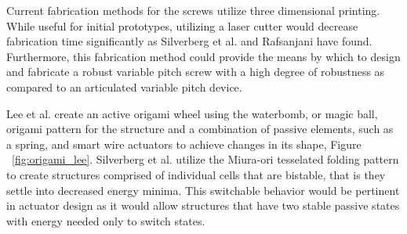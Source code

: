 Current fabrication methods for the screws utilize three dimensional printing. While useful for initial prototypes, utilizing a laser cutter would decrease fabrication time significantly as Silverberg et al. \cite{Silverberg2015} and Rafsanjani \cite{Rafsanjani2018} have found. Furthermore, this fabrication method could provide the means by which to design and fabricate a robust variable pitch screw with a high degree of robustness as compared to an articulated variable pitch device. 



Lee et al.\cite{Lee2013} create an active origami wheel using the waterbomb, or magic ball, origami pattern for the structure and a combination of passive elements, such as a spring, and smart wire actuators to achieve changes in its shape, Figure ~\ref{fig:origami_lee}. Silverberg et al. \cite{Silverberg2015} utilize the Miura-ori tesselated folding pattern to create structures comprised of individual cells that are bistable, that is they settle into decreased energy minima. This switchable behavior would be pertinent in actuator design as it would allow structures that have two stable passive states with energy needed only to switch states. 




